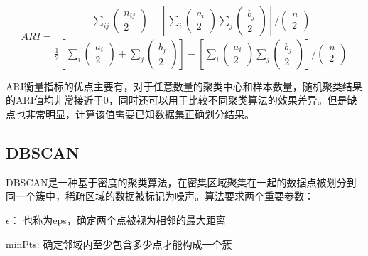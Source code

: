 \begin{equation}
	ARI = \frac{\sum_{i j}\left(\begin{array}{c}
				n_{i j} \\
				2
			\end{array}\right)-\left[\sum_i\left(\begin{array}{c}
				a_i \\
				2
			\end{array}\right) \sum_j\left(\begin{array}{c}
				b_j \\
				2
			\end{array}\right)\right] /\left(\begin{array}{c}
				n \\
				2
			\end{array}\right)}{\frac{1}{2}\left[\sum_i\left(\begin{array}{c}
				a_i \\
				2
			\end{array}\right)+\sum_j\left(\begin{array}{c}
				b_j \\
				2
			\end{array}\right)\right]-\left[\sum_i\left(\begin{array}{c}
				a_i \\
				2
			\end{array}\right) \sum_j\left(\begin{array}{c}
				b_j \\
				2
			\end{array}\right)\right] /\left(\begin{array}{c}
				n \\
				2
			\end{array}\right)}
	\label{equ_ari}
\end{equation}

ARI衡量指标的优点主要有，对于任意数量的聚类中心和样本数量，随机聚类结果的ARI值均非常接近于0，同时还可以用于比较不同聚类算法的效果差异。但是缺点也非常明显，计算该值需要已知数据集正确划分结果。


\subsection{DBSCAN}
DBSCAN是一种基于密度的聚类算法，在密集区域聚集在一起的数据点被划分到同一个簇中，稀疏区域的数据被标记为噪声\cite{khan2014dbscan}。算法要求两个重要参数：
\begin{compactitem}
	\item $\epsilon$： 也称为eps，确定两个点被视为相邻的最大距离
	\item minPts: 确定邻域内至少包含多少点才能构成一个簇
\end{compactitem}

